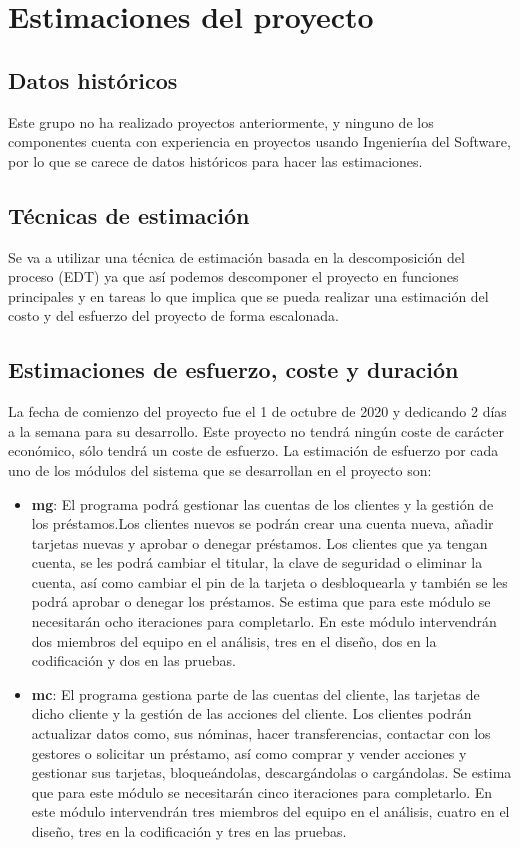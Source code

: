 \section{Estimaciones del proyecto}
\subsection{Datos históricos}
Este grupo no ha realizado proyectos anteriormente, y ninguno de los componentes
cuenta con experiencia en proyectos usando Ingenieríıa del Software, por lo que se carece
de datos históricos para hacer las estimaciones.
\subsection{Técnicas de estimación}
Se va a utilizar una técnica de estimación basada en la descomposición del proceso
(EDT) ya que así podemos descomponer el proyecto en funciones principales y en tareas
lo que implica que se pueda realizar una estimación del costo y del esfuerzo del proyecto
de forma escalonada.

\subsection{Estimaciones de esfuerzo, coste y duración}
La fecha de comienzo del proyecto fue el 1 de octubre de 2020 y dedicando 2 días a la semana para su desarrollo. Este proyecto no tendrá ningún coste de carácter económico, sólo tendrá un coste de esfuerzo.
La estimación de esfuerzo por cada uno de los módulos del sistema que se desarrollan en el proyecto son:
\begin{itemize}
	\item \textbf{\gls{mg}}: El programa podrá gestionar las cuentas de los clientes  y la gestión de los préstamos.Los clientes nuevos se  podrán crear una cuenta nueva,  añadir tarjetas nuevas  y aprobar o denegar préstamos. Los clientes que ya tengan cuenta, se les podrá cambiar el titular, la clave de seguridad o eliminar la cuenta, así como cambiar el pin de la tarjeta o desbloquearla y también se les podrá aprobar o denegar los préstamos. Se estima que para este módulo se necesitarán ocho iteraciones para completarlo. En este módulo intervendrán dos miembros del equipo en el análisis, tres en el diseño, dos en la codificación y dos en las pruebas.
	\item \textbf{\gls{mc}}: El programa gestiona parte de las cuentas del cliente,  las tarjetas de dicho cliente y la gestión de las acciones del cliente. Los clientes podrán actualizar datos como, sus nóminas, hacer transferencias, contactar con los gestores o solicitar un préstamo, así como  comprar y vender acciones y gestionar sus tarjetas, bloqueándolas, descargándolas o cargándolas. Se estima que para este módulo se necesitarán cinco iteraciones para completarlo. En este módulo intervendrán tres miembros del equipo en el análisis, cuatro en el diseño, tres en la codificación y tres en las pruebas.
\end{itemize}

